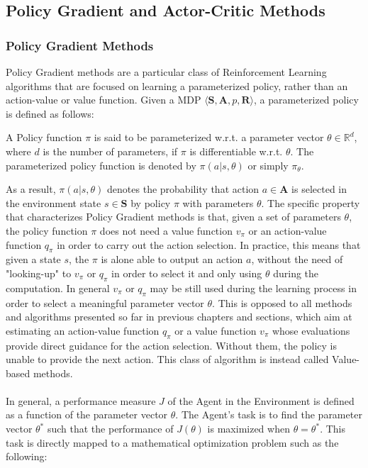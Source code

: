         \subsection{Policy Gradient and Actor-Critic Methods}
        \label{subs:policygrad_actorcritic}
            \subsubsection{Policy Gradient Methods}
                Policy Gradient methods are a particular class of Reinforcement Learning algorithms that are focused on learning a parameterized policy, rather than an action-value or value function. Given a MDP $\langle \mathbf{S}, \mathbf{A}, p, \mathbf{R}\rangle$, a parameterized policy is defined as follows:
                
                \begin{definition}
                    \label{def:parameterizedpi}
                    A Policy function $\pi$ is said to be parameterized w.r.t. a parameter vector $\theta \in \mathbb{R}^d$, where $d$ is the number of parameters, if $\pi$ is differentiable w.r.t. $\theta$. The parameterized policy function is denoted by $\pi(a|s, \theta)$ or simply $\pi_\theta$.
                \end{definition}
                
                As a result, $\pi(a|s, \theta)$ denotes the probability that action $a \in \mathbf{A}$ is selected in the environment state $s \in \mathbf{S}$ by policy $\pi$ with parameters $\theta$. The specific property that characterizes Policy Gradient methods is that, given a set of parameters $\theta$, the policy function $\pi$ does not need a value function $v_\pi$ or an action-value function $q_\pi$ in order to carry out the action selection. In practice, this means that given a state $s$, the $\pi$ is alone able to output an action $a$, without the need of "looking-up" to $v_\pi$ or $q_\pi$ in order to select it and only using  $\theta$ during the computation. In general $v_\pi$ or $q_\pi$ may be still used during the learning process in order to select a meaningful parameter vector $\theta$. \newline
                This is opposed to all methods and algorithms presented so far in previous chapters and sections, which aim at estimating an action-value function $q_\pi$ or a value function $v_\pi$ whose evaluations provide direct guidance for the action selection. Without them, the policy is unable to provide the next action. This class of algorithm is instead called Value-based methods.
                \\\\
                In general, a performance measure $J$ of the Agent in the Environment is defined as a function of the parameter vector $\theta$. The Agent's task is to find the parameter vector $\theta^*$ such that the performance of $J(\theta)$ is maximized when $\theta = \theta^*$. This task is directly mapped to a mathematical optimization problem such as the following:
                
